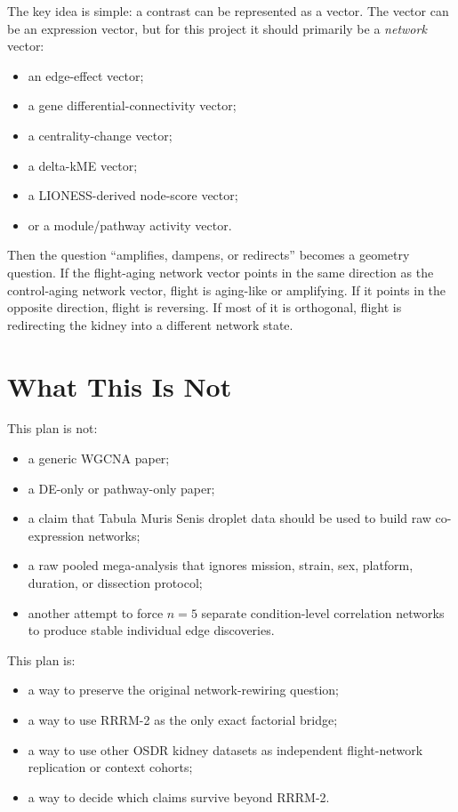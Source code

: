 \documentclass[11pt]{article}
\begin{document}
The key idea is simple: a contrast can be represented as a vector. The vector can
be an expression vector, but for this project it should primarily be a
\emph{network} vector:

\begin{itemize}
  \item an edge-effect vector;
  \item a gene differential-connectivity vector;
  \item a centrality-change vector;
  \item a delta-kME vector;
  \item a LIONESS-derived node-score vector;
  \item or a module/pathway activity vector.
\end{itemize}

Then the question ``amplifies, dampens, or redirects'' becomes a geometry
question. If the flight-aging network vector points in the same direction as the
control-aging network vector, flight is aging-like or amplifying. If it points in
the opposite direction, flight is reversing. If most of it is orthogonal, flight
is redirecting the kidney into a different network state.

\section{What This Is Not}

This plan is not:

\begin{itemize}
  \item a generic WGCNA paper;
  \item a DE-only or pathway-only paper;
  \item a claim that Tabula Muris Senis droplet data should be used to build raw
        co-expression networks;
  \item a raw pooled mega-analysis that ignores mission, strain, sex, platform,
        duration, or dissection protocol;
  \item another attempt to force $n=5$ separate condition-level correlation
        networks to produce stable individual edge discoveries.
\end{itemize}

This plan is:

\begin{itemize}
  \item a way to preserve the original network-rewiring question;
  \item a way to use RRRM-2 as the only exact factorial bridge;
  \item a way to use other OSDR kidney datasets as independent flight-network
        replication or context cohorts;
  \item a way to decide which claims survive beyond RRRM-2.
\end{itemize}
\end{document}
